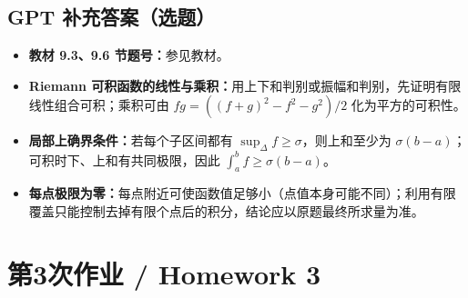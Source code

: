 \documentclass[UTF8,11pt, a4paper, oneside, fontset=none]{ctexbook}
\begin{document}
\subsection*{GPT 补充答案（选题）}
\begin{itemize}
\item \textbf{教材 9.3、9.6 节题号：}参见教材。
\item \textbf{Riemann 可积函数的线性与乘积：}用上下和判别或振幅和判别，先证明有限线性组合可积；乘积可由 $fg=((f+g)^2-f^2-g^2)/2$ 化为平方的可积性。
\item \textbf{局部上确界条件：}若每个子区间都有 $\sup_\Delta f\ge\sigma$，则上和至少为 $\sigma(b-a)$；可积时下、上和有共同极限，因此 $\int_a^b f\ge\sigma(b-a)$。
\item \textbf{每点极限为零：}每点附近可使函数值足够小（点值本身可能不同）；利用有限覆盖只能控制去掉有限个点后的积分，结论应以原题最终所求量为准。
\end{itemize}
\clearpage
\section{第3次作业 / Homework 3}
\end{document}
